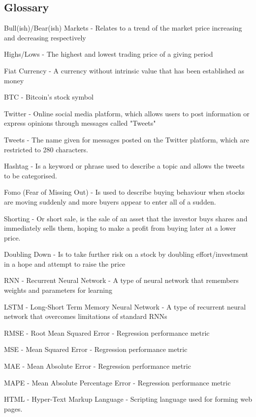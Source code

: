 \documentclass[oneside, 12pt]{article}
\begin{document}
	\newpage
	\begin{center}
		\section{Glossary}\label{glossary}
	\end{center}
	Bull(ish)/Bear(ish) Markets - Relates to a trend of the market price increasing and decreasing respectively
	
	Highs/Lows - The highest and lowest trading price of a giving period
	
	Fiat Currency - A currency without intrinsic value that has been established as money
	
	BTC - Bitcoin's stock symbol
	
	Twitter - Online social media platform, which allows users to post information or express opinions through messages called "Tweets"
	
	Tweets - The name given for messages posted on the Twitter platform, which are restricted to 280 characters.
	
	Hashtag - Is a keyword or phrase used to describe a topic and allows the tweets to be categorised.
	
	Fomo (Fear of Missing Out) - Is used to describe buying behaviour when stocks are moving suddenly and more buyers appear to enter all of a sudden.
	
	Shorting - Or short sale, is the sale of an asset that the investor buys shares and immediately sells them, hoping to make a profit from buying later at a lower price.
	
	Doubling Down - Is to take further risk on a stock by doubling effort/investment in a hope and attempt to raise the price
	
	RNN - Recurrent Neural Network - A type of neural network that remembers weights and parameters for learning
	
	LSTM - Long-Short Term Memory Neural Network - A type of recurrent neural network that overcomes limitations of standard RNNs
	
	RMSE - Root Mean Squared Error - Regression performance metric
	
	MSE - Mean Squared Error - Regression performance metric
	
	MAE - Mean Absolute Error - Regression performance metric
	
	MAPE - Mean Absolute Percentage Error - Regression performance metric
	
	HTML - Hyper-Text Markup Language - Scripting language used for forming web pages.
	
\end{document}
